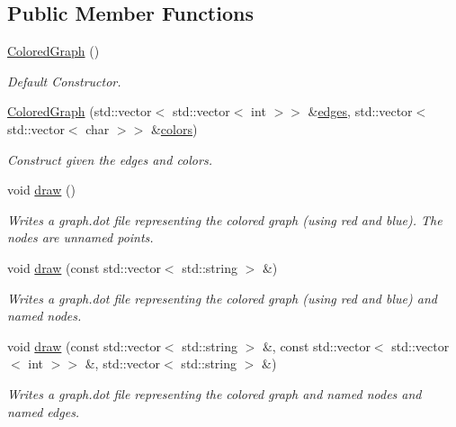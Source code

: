 \subsection*{Public Member Functions}
\begin{DoxyCompactItemize}
\item 
\hyperlink{classMackey_1_1ColoredGraph_a367055b4a615119cc767a738f6e9e719}{Colored\+Graph} ()
\begin{DoxyCompactList}\small\item\em Default Constructor. \end{DoxyCompactList}\item 
\hyperlink{classMackey_1_1ColoredGraph_adada856cdbfc508b2df15919f45a1808}{Colored\+Graph} (std\+::vector$<$ std\+::vector$<$ int $>$$>$ \&\hyperlink{classMackey_1_1Graph_a729ec24b9f9e504f4c4e2d3f6e2cab83}{edges}, std\+::vector$<$ std\+::vector$<$ char $>$$>$ \&\hyperlink{classMackey_1_1ColoredGraph_a29fbdcaf9f94f0f5d48e5390ba49b338}{colors})
\begin{DoxyCompactList}\small\item\em Construct given the edges and colors. \end{DoxyCompactList}\item 
void \hyperlink{classMackey_1_1ColoredGraph_a8ed05073805b34a0087a7ed94e889694}{draw} ()
\begin{DoxyCompactList}\small\item\em Writes a graph.\+dot file representing the colored graph (using red and blue). The nodes are unnamed points. \end{DoxyCompactList}\item 
void \hyperlink{classMackey_1_1ColoredGraph_a912a6e5cb94386d9ff6510e968b41e7d}{draw} (const std\+::vector$<$ std\+::string $>$ \&)
\begin{DoxyCompactList}\small\item\em Writes a graph.\+dot file representing the colored graph (using red and blue) and named nodes. \end{DoxyCompactList}\item 
void \hyperlink{classMackey_1_1ColoredGraph_a88cde9e3cc3bfb72409142ac6705b474}{draw} (const std\+::vector$<$ std\+::string $>$ \&, const std\+::vector$<$ std\+::vector$<$ int $>$$>$ \&, std\+::vector$<$ std\+::string $>$ \&)
\begin{DoxyCompactList}\small\item\em Writes a graph.\+dot file representing the colored graph and named nodes and named edges. \end{DoxyCompactList}\end{DoxyCompactItemize}
